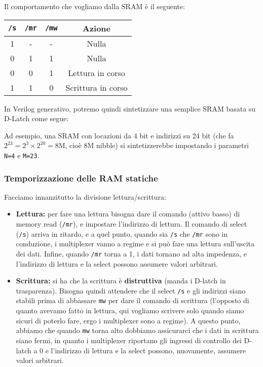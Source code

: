 \documentclass[a4paper,11pt]{article}
\begin{document}
Il comportamento che vogliamo dalla SRAM è il seguente:
\begin{table}[h!]
	\center {}
	\begin{tabular} { c | c | c || c }
		\bfseries \lstinline|/s| & \bfseries \lstinline|/mr| & \bfseries \lstinline|/mw| & \bfseries Azione \\
		\hline 
		1 & - & - & Nulla \\ 
		0 & 1 & 1 & Nulla \\ 
		0 & 0 & 1 & Lettura in corso \\ 
		1 & 1 & 0 & Scrittura in corso \\ 
	\end{tabular}
\end{table}

In Verilog generativo, potremo quindi sintetizzare una semplice SRAM basata su D-Latch come segue:



Ad esempio, una SRAM con locazioni da 4 bit e indirizzi su 24 bit (che fa $2^{23} = 2^3 \times 2^{20} = 8 \mathrm{M}$, cioè 8M nibble) si sintetizzerebbe impostando i parametri \lstinline|N=4| e \lstinline|M=23|. 

\subsubsection{Temporizzazione delle RAM statiche}
Facciamo innanzitutto la divisione lettura/scrittura:
\begin{itemize}
	\item \textbf{Lettura:} per fare una lettura bisogna dare il comando (attivo basso) di memory read (\lstinline|/mr|), e impostare l'indirizzo di lettura.
Il comando di select (\lstinline|/s|) arriva in ritardo, e a quel punto, quando sia \lstinline|/s| che \lstinline|/mr| sono in conduzione, i multiplexer vanno a regime e si può fare una lettura sull'uscita dei dati.
Infine, quando \lstinline|/mr| torna a 1, i dati tornano ad alta impedenza, e l'indirizzo di lettura e la select possono assumere valori arbitrari.
	\item \textbf{Scrittura:} si ha che la scrittura è \textbf{distruttiva} (manda i D-latch in trasparenza). Bisogna quindi attendere che il select \lstinline|/s| e gli indirizzi siano stabili prima di abbassare \lstinline|mw| per dare il comando di scrittura (l'opposto di quanto avevamo fatto in lettura, qui vogliamo scrivere solo quando siamo sicuri di poterlo fare, ergo i multiplexer sono a regime).
		A questo punto, abbiamo che quando \lstinline|mw| torna alto dobbiamo assicurarci che i dati in scrittura siano fermi, in quanto i multiplexer riportano gli ingressi di controllo dei D-latch a 0 e l'indirizzo di lettura e la select possono, nuovamente, assumere valori arbitrari.
\end{itemize}
\end{document}
